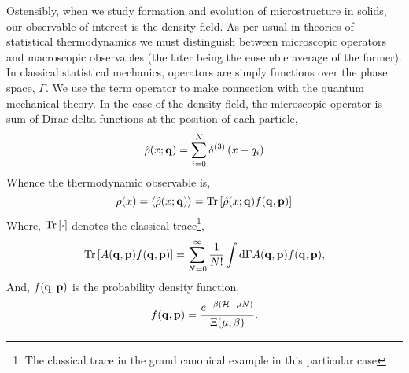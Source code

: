 Ostensibly, when we study formation and evolution of microstructure in solids,
our observable of interest is the density field.  As per usual in theories of
statistical thermodynamics we must distinguish between microscopic operators
and macroscopic observables (the later being the ensemble average of the
former).  In classical statistical mechanics, operators are simply functions
over the phase space, $\Gamma$.  We use the term operator to make connection
with the quantum mechanical theory.  In the case of the density field, the
microscopic operator is sum of Dirac delta functions at the position of each
particle,
%
\begin{equation} 
    \hat{\rho}(x; \mathbf{q}) = \sum_{i = 0}^N \delta^{(3)}\left(x - q_i\right)
\end{equation}
%
Whence the thermodynamic observable is, 
%
\begin{equation} 
    \rho(x) = \left\langle \hat{\rho}(x; \mathbf{q}) \right\rangle = 
        \mathrm{Tr}\left[ \hat{\rho}(x; \mathbf{q}) f(\mathbf{q}, \mathbf{p}) \right]
\end{equation}
%
Where, $\mathrm{Tr}\left[ \cdot \right]$ denotes the classical trace\footnote{The classical trace
in the grand canonical example in this particular case},
%
\begin{equation}
    \mathrm{Tr}\left[ A(\mathbf{q}, \mathbf{p}) f(\mathbf{q}, \mathbf{p}) \right] = \sum_{N =0}^\infty
        \frac{1}{N!}\int\mathrm{d}\Gamma A(\mathbf{q}, \mathbf{p}) f(\mathbf{q}, \mathbf{p}), 
\end{equation}
%
And, $f(\mathbf{q}, \mathbf{p})$ is the probability density function,
%
\begin{equation} 
    f(\mathbf{q}, \mathbf{p}) = \frac{e^{-\beta (\mathcal{H} - \mu N)}}{\Xi(\mu, \beta)}.
\end{equation}
%

